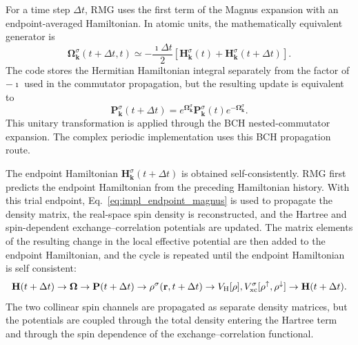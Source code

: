 For a time step $\Delta t$, RMG uses the first term of the Magnus
expansion with an endpoint-averaged Hamiltonian.  In atomic units, the
mathematically equivalent generator is
\begin{equation}
  \boldsymbol{\Omega}_{\mathbf k}^{\sigma}(t+\Delta t,t)
  \simeq
  -\frac{\imath\Delta t}{2}
  \left[
    \mathbf H_{\mathbf k}^{\sigma}(t)
    +
    \mathbf H_{\mathbf k}^{\sigma}(t+\Delta t)
  \right].
  \label{eq:impl_endpoint_magnus}
\end{equation}
The code stores the Hermitian Hamiltonian integral separately from the
factor of $-\imath$ used in the commutator propagation, but the
resulting update is equivalent to
\begin{equation}
  \mathbf P_{\mathbf k}^{\sigma}(t+\Delta t)
  =
  e^{\boldsymbol{\Omega}_{\mathbf k}^{\sigma}}
  \mathbf P_{\mathbf k}^{\sigma}(t)
  e^{-\boldsymbol{\Omega}_{\mathbf k}^{\sigma}} .
  \label{eq:impl_density_update}
\end{equation}
This unitary transformation is applied through the BCH
nested-commutator expansion.  The complex periodic implementation uses
this BCH propagation route.

The endpoint Hamiltonian
$\mathbf H_{\mathbf k}^{\sigma}(t+\Delta t)$ is obtained
self-consistently.  RMG first predicts the endpoint Hamiltonian from
the preceding Hamiltonian history.  With this trial endpoint,
Eq.~\eqref{eq:impl_endpoint_magnus} is used to propagate the density
matrix, the real-space spin density is reconstructed, and the Hartree
and spin-dependent exchange--correlation potentials are updated.  The
matrix elements of the resulting change in the local effective
potential are then added to the endpoint Hamiltonian, and the cycle is
repeated until the endpoint Hamiltonian is self consistent:
\[
  \mathbf H(t+\Delta t)
  \rightarrow
  \boldsymbol{\Omega}
  \rightarrow
  \mathbf P(t+\Delta t)
  \rightarrow
  \rho^\sigma(\mathbf r,t+\Delta t)
  \rightarrow
  V_{\rm H}[\rho],
  V_{\rm xc}^{\sigma}[\rho^\uparrow,\rho^\downarrow]
  \rightarrow
  \mathbf H(t+\Delta t).
\]
The two collinear spin channels are propagated as separate density
matrices, but the potentials are coupled through the total density
entering the Hartree term and through the spin dependence of the
exchange--correlation functional.

